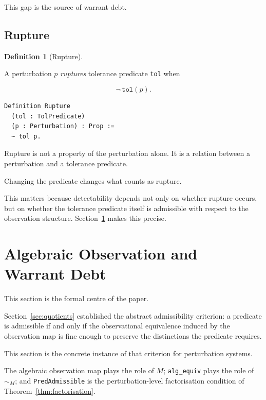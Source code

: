 \documentclass[pdflatex,sn-mathphys-num]{sn-jnl}
\theoremstyle{plain}
\theoremstyle{definition}
\newtheorem{definition}[theorem]{Definition}
\theoremstyle{remark}
\begin{document}
This gap is the source of warrant debt.

\subsection{Rupture}

\begin{definition}[Rupture]
\label{def:rupture}

A perturbation $p$ \emph{ruptures} tolerance predicate
\texttt{tol} when

\[
\neg\,\mathtt{tol}(p).
\]

\end{definition}

\begin{lstlisting}[style=rocq,
caption={Rupture.}]
Definition Rupture
  (tol : TolPredicate)
  (p : Perturbation) : Prop :=
  ~ tol p.
\end{lstlisting}

Rupture is not a property of the perturbation alone.
It is a relation between a perturbation and a tolerance predicate.

Changing the predicate changes what counts as rupture.

This matters because detectability depends not only on whether rupture
occurs, but on whether the tolerance predicate itself is admissible
with respect to the observation structure.
Section~\ref{sec:warrant} makes this precise.

\section{Algebraic Observation and Warrant Debt}
\label{sec:warrant}

This section is the formal centre of the paper.

Section~\ref{sec:quotients} established the abstract admissibility
criterion: a predicate is admissible if and only if the observational
equivalence induced by the observation map is fine enough to preserve
the distinctions the predicate requires.

This section is the concrete instance of that criterion for
perturbation systems.

The algebraic observation map plays the role of $M$; \texttt{alg\_equiv}
plays the role of $\sim_M$; and \texttt{PredAdmissible} is the
perturbation-level factorisation condition of
Theorem~\ref{thm:factorisation}.
\end{document}
